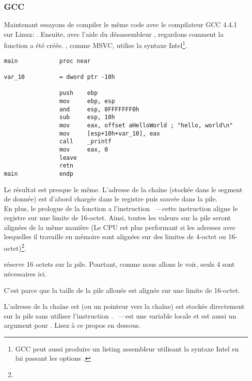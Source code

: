 ﻿\subsubsection{GCC}

Maintenant essayons de compiler le même code \CCpp avec le compilateur GCC 4.4.1 sur Linux: .
Ensuite, avec l'aide du désassembleur \IDA, regardons comment la fonction \main a été créée.
\IDA, comme MSVC, utilise la syntaxe Intel\footnote{GCC peut aussi produire un listing assembleur utilisant la syntaxe Intel en lui passant les options .}.

\begin{lstlisting}[caption=code in \IDA,style=customasmx86]
main            proc near

var_10          = dword ptr -10h

                push    ebp
                mov     ebp, esp
                and     esp, 0FFFFFFF0h
                sub     esp, 10h
                mov     eax, offset aHelloWorld ; "hello, world\n"
                mov     [esp+10h+var_10], eax
                call    _printf
                mov     eax, 0
                leave
                retn
main            endp
\end{lstlisting}

Le résultat est presque le même.
L'adresse de la chaîne  (stockée dans le segment de donnée) est d'abord chargée dans
 le registre \EAX puis sauvée dans la pile. \\
En plus, le prologue de la fonction a l'instruction ~---cette
instruction aligne le registre \ESP sur une limite de 16-octet.
Ainsi, toutes les valeurs sur la pile seront alignées de la même manière (Le CPU
est plus performant si les adresses avec lesquelles il travaille en mémoire sont
alignées sur des limites de 4-octet ou 16-octet)\footnote{\URLWPDA}.

 réserve 16 octets sur la pile. Pourtant, comme nous allons le voir, seuls 4 sont nécessaires ici.

C'est parce que la taille de la pile allouée est alignée sur une limite de 16-octet.

L'adresse de la chaîne est (ou un pointeur vers la chaîne) est stockée directement sur la pile sans utiliser
l'instruction \PUSH.
~---est une variable locale et est aussi un argument pour \printf{}.
Lisez à ce propos en dessous.

